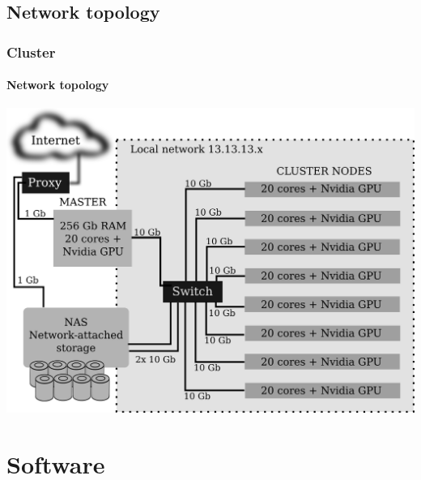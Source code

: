 \documentclass[svgnames,smaller,table]{beamer}
\begin{document}
\subsection{Network topology}
\begin{frame}
  \frametitle{Cluster}
  \framesubtitle{Network topology}
  \begin{center}
    \includegraphics[scale=0.45]{images/cluster-rede.png}
  \end{center}
  
\end{frame}





\section{Software}
%
\end{document}
